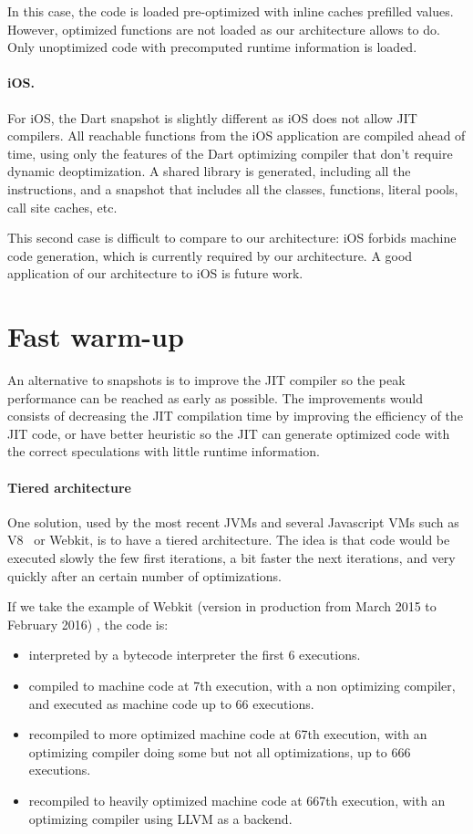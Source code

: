 \documentclass[a4paper,12pt,twoside]{../includes/ThesisStyle}
\begin{document}
In this case, the code is loaded pre-optimized with inline caches prefilled values. However, optimized functions are not loaded as our architecture allows to do. Only unoptimized code with precomputed runtime information is loaded.

\paragraph{iOS.} For iOS, the Dart snapshot is slightly different as iOS does not allow JIT compilers. All reachable functions from the iOS application are compiled ahead of time, using only the features of the Dart optimizing compiler that don't require dynamic deoptimization. A shared library is generated, including all the instructions, and a snapshot that includes all the classes, functions, literal pools, call site caches, etc.

This second case is difficult to compare to our architecture: iOS forbids machine code generation, which is currently required by our architecture. A good application of our architecture to iOS is future work.

\section{Fast warm-up}

An alternative to snapshots is to improve the JIT compiler so the peak performance can be reached as early as possible. The improvements would consists of decreasing the JIT compilation time by improving the efficiency of the JIT code, or have better heuristic so the JIT can generate optimized code with the correct speculations with little runtime information.

\paragraph{Tiered architecture}
One solution, used by the most recent JVMs and several Javascript VMs such as V8~\cite{V8} or Webkit, is to have a tiered architecture. The idea is that code would be executed slowly the few first iterations, a bit faster the next iterations, and very quickly after an certain number of optimizations. 

If we take the example of Webkit (version in production from March 2015 to February 2016) \cite{Webkit15}, the code is:
\begin{itemize}
\item interpreted by a bytecode interpreter the first 6 executions.
\item compiled to machine code at 7th execution, with a non optimizing compiler, and executed as machine code up to 66 executions.
\item recompiled to more optimized machine code at 67th execution, with an optimizing compiler doing some but not all optimizations, up to 666 executions.
\item recompiled to heavily optimized machine code at 667th execution, with an optimizing compiler using LLVM as a backend.
\end{itemize}
\end{document}
